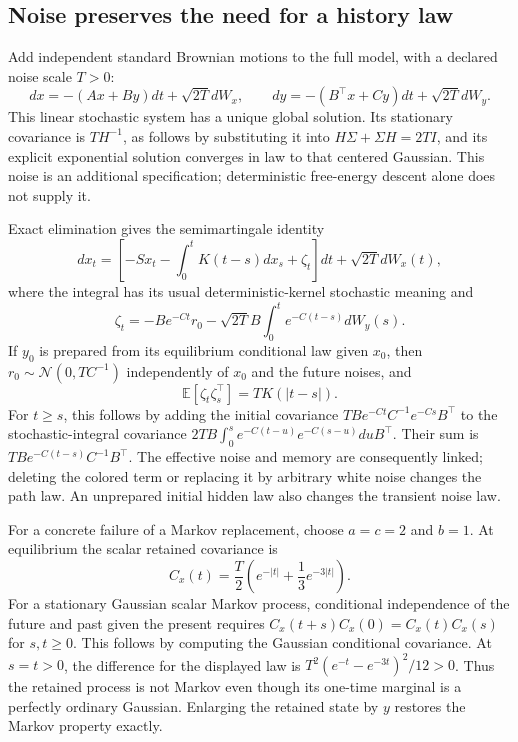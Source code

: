 \subsection{Noise preserves the need for a history law}
\label{sec:persistence_stochastic_memory}

Add independent standard Brownian motions to the full model, with a declared noise scale $T>0$:
\begin{equation}
 dx=-(Ax+By)dt+\sqrt{2T}dW_x,\qquad
 dy=-(B^\top x+Cy)dt+\sqrt{2T}dW_y.
 \label{eq:persistence_OU}
\end{equation}
This linear stochastic system has a unique global solution. Its stationary covariance is $TH^{-1}$, as follows by substituting it into $H\Sigma+\Sigma H=2TI$, and its explicit exponential solution converges in law to that centered Gaussian. This noise is an additional specification; deterministic free-energy descent alone does not supply it.

Exact elimination gives the semimartingale identity
\begin{equation}
 dx_t=\left[-Sx_t-\int_0^t K(t-s)dx_s+\zeta_t\right]dt
 +\sqrt{2T}dW_x(t),
 \label{eq:persistence_stochastic_reduction}
\end{equation}
where the integral has its usual deterministic-kernel stochastic meaning and
\begin{equation}
 \zeta_t=-Be^{-Ct}r_0
 -\sqrt{2T}B\int_0^t e^{-C(t-s)}dW_y(s).
\end{equation}
If $y_0$ is prepared from its equilibrium conditional law given $x_0$, then
$r_0\sim\mathcal N(0,TC^{-1})$ independently of $x_0$ and the future noises, and
\begin{equation}
 \mathbb E[\zeta_t\zeta_s^\top]=TK(|t-s|).
 \label{eq:persistence_fluctuation_memory}
\end{equation}
For $t\ge s$, this follows by adding the initial covariance
$TBe^{-Ct}C^{-1}e^{-Cs}B^\top$ to the stochastic-integral covariance
$2TB\int_0^s e^{-C(t-u)}e^{-C(s-u)}duB^\top$.
Their sum is $TBe^{-C(t-s)}C^{-1}B^\top$. The effective noise and memory are consequently linked; deleting the colored term or replacing it by arbitrary white noise changes the path law. An unprepared initial hidden law also changes the transient noise law.

For a concrete failure of a Markov replacement, choose $a=c=2$ and $b=1$. At equilibrium the scalar retained covariance is
\begin{equation}
 C_x(t)=\frac T2\left(e^{-|t|}+\frac13e^{-3|t|}\right).
 \label{eq:persistence_nonmarkov_covariance}
\end{equation}
For a stationary Gaussian scalar Markov process, conditional independence of the future and past given the present requires
$C_x(t+s)C_x(0)=C_x(t)C_x(s)$ for $s,t\ge0$. This follows by computing the Gaussian conditional covariance. At $s=t>0$, the difference for the displayed law is
$T^2(e^{-t}-e^{-3t})^2/12>0$. Thus the retained process is not Markov even though its one-time marginal is a perfectly ordinary Gaussian. Enlarging the retained state by $y$ restores the Markov property exactly.

